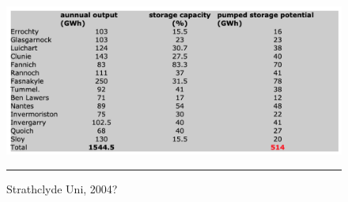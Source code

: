 \begin{figure}[htbp]
	\centering
	\includegraphics[width=\textwidth]{figures/PHS_potential.png}
	\rule{\textwidth}{0.5pt} %
	\caption{Strathclyde Uni, 2004?}
	\label{fig:PHS_potential}
\end{figure}